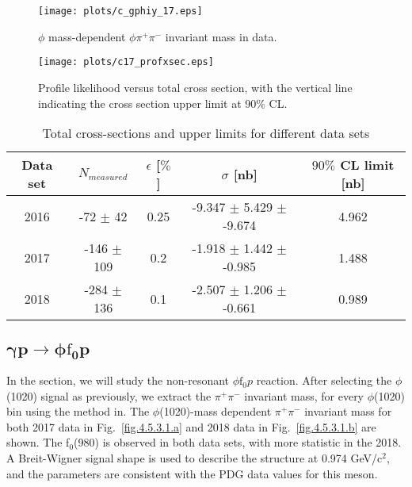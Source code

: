 \begin{figure}[H]
    \centering
    \texttt{[image: plots/c\_gphiy\_17.eps]}
    \caption{\label{fig.4.5.2.1}$\phi$ mass-dependent $\phi \pi^+ \pi^-$ invariant mass in data.}
\end{figure}

\begin{figure}[H]
    \centering
    \texttt{[image: plots/c17\_profxsec.eps]}
    \caption{\label{fig.4.5.2.2}Profile likelihood versus total cross section, with the vertical line indicating the cross section upper limit at 90$\%$ CL.}
\end{figure}

\begin{table}[!htbp]
    \centering
    \caption{Total cross-sections and upper limits for different data sets}
    \label{tab.4.5.2}
    \begin{tabular}{|c|c|c|c|c|}
        \hline
        Data set & $N_{measured}$ & $\epsilon$ [$\%$] & $\sigma$ [nb] & $90\%$ CL limit [nb] \\
        \hline
        2016 &  -72 $\pm$ 42 & 0.25 & -9.347 $\pm$ 5.429 $\pm$ -9.674 & 4.962 \\
        \hline
        2017 & -146 $\pm$ 109 & 0.2 & -1.918 $\pm$ 1.442 $\pm$ -0.985 & 1.488 \\
        \hline
        2018 & -284 $\pm$ 136 & 0.1 & -2.507 $\pm$ 1.206 $\pm$ -0.661 & 0.989 \\
        \hline
    \end{tabular}
\end{table}

\subsection{\texorpdfstring{$\bm{\gamma p \rightarrow \phi \mathrm{f}_0 p}$}{}}
\label{p.4.5.3}

In the section, we will study the non-resonant $\phi \mathrm{f}_0 p$ reaction. After selecting the $\phi$(1020) signal as previously, we extract the $\pi^+ \pi^-$ invariant mass, for every $\phi$(1020) bin using the method in.
The $\phi$(1020)-mass dependent $\pi^+ \pi^-$ invariant mass for both 2017 data in Fig.~\ref{fig.4.5.3.1.a} and 2018 data in Fig.~\ref{fig.4.5.3.1.b} are shown. The f$_0$(980) is observed in both data sets, with more statistic in the 2018. A Breit-Wigner signal shape is used to describe the structure at 0.974 GeV/c$^2$, and the parameters are consistent with the PDG data values for this meson.

